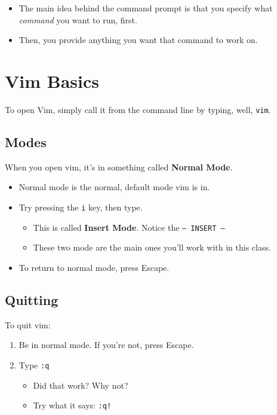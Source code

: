 \documentclass[aspectratio=1610]{beamer}                  %
\newcommand{\srule}{
	\rule{\textwidth}{1pt}\\
}
\newlength{\subsecwidth}
\newenvironment{slide}{
	\begin{frame}                                    %
		\settowidth{\subsecwidth}{\insertsubsection} %
		\ifthenelse{\dimtest{\subsecwidth}{<}{1pt}}{ %
			\frametitle{\huge \insertsection\\             %
				\vspace{-1ex}                            %
			}
		}{                                           %
			\frametitle{\huge \insertsection\ -- \insertsubsection\\ %
				\vspace{-1ex}                            %
			}
		}
		\Large                                       %
	}{
	\end{frame}
}
\begin{document}
\begin{slide}
    \begin{itemize}
        \item The main idea behind the command prompt is that you specify what
            \textit{command} you want to run, first.
        \item Then, you provide anything you want that command to work on.
    \end{itemize}
\end{slide}

\section{Vim Basics}
\begin{slide}
    To open Vim, simply call it from the command line by typing, well, \texttt{vim}.
\end{slide}

\subsection{Modes}
\begin{slide}
    When you open vim, it's in something called \textbf{Normal Mode}.
    \begin{itemize}
        \item Normal mode is the normal, default mode vim is in.
        \item Try pressing the \texttt{i} key, then type.
            \begin{itemize}
                \item This is called \textbf{Insert Mode}. Notice the \texttt{-- INSERT --}
                \item These two mode are the main ones you'll work with in this class.
            \end{itemize}
        \item To return to normal mode, press Escape.
    \end{itemize}
\end{slide}

\subsection{Quitting}
\begin{slide}
    To quit vim:
    \begin{enumerate}
        \item Be in normal mode. If you're not, press Escape.
        \item Type \texttt{:q}
            \begin{itemize}
                \item Did that work? Why not?
                \item Try what it says: \texttt{:q!}
            \end{itemize}
    \end{enumerate}
\end{slide}
\end{document}
